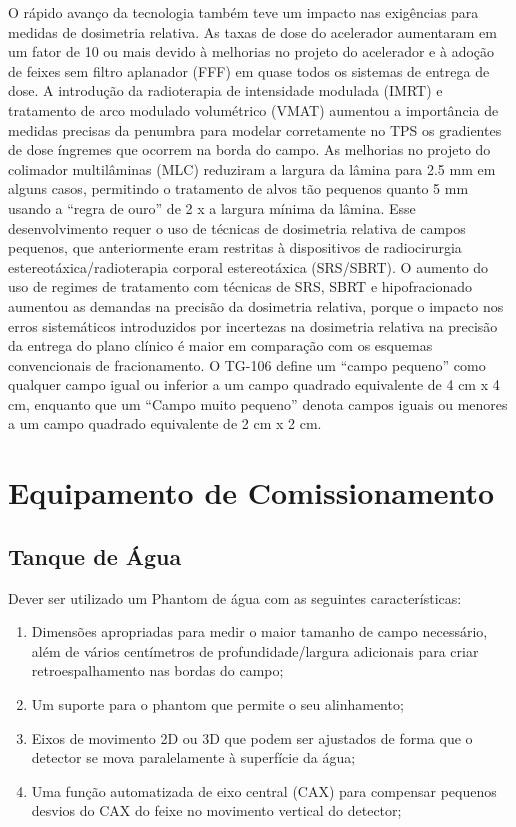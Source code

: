 \documentclass[11pt,a4paper]{article}
\begin{document}
	O rápido avanço da tecnologia também teve um impacto nas exigências para medidas de dosimetria relativa. As taxas de dose do acelerador aumentaram em um fator de 10 ou mais devido à melhorias no projeto do acelerador e à adoção de feixes sem filtro aplanador (FFF) em quase todos os sistemas de entrega de dose. A introdução da radioterapia de intensidade modulada (IMRT) e tratamento de arco modulado volumétrico (VMAT) aumentou a importância de medidas precisas da penumbra para modelar corretamente no TPS os gradientes de dose íngremes que ocorrem na borda do campo. As melhorias no projeto do colimador multilâminas (MLC) reduziram a largura da lâmina para 2.5 mm em alguns casos, permitindo o tratamento de alvos tão pequenos quanto 5 mm usando a ``regra de ouro'' de 2 x a largura mínima da lâmina. Esse desenvolvimento requer o uso de técnicas de dosimetria relativa de campos pequenos, que anteriormente eram restritas à dispositivos de radiocirurgia estereotáxica/radioterapia corporal estereotáxica (SRS/SBRT). O aumento do uso de regimes de tratamento com técnicas de SRS, SBRT e hipofracionado aumentou as demandas na precisão da dosimetria relativa, porque o impacto nos erros sistemáticos introduzidos por incertezas na dosimetria relativa na precisão da entrega do plano clínico é maior em comparação com os esquemas convencionais de fracionamento. O TG-106 define um “campo pequeno” como qualquer campo igual ou inferior a um campo quadrado equivalente de 4 cm x 4 cm, enquanto que um “Campo muito pequeno” denota campos iguais ou menores a um campo quadrado equivalente de 2 cm x 2 cm.

\section{Equipamento de Comissionamento}

\subsection{Tanque de Água}

	Dever ser utilizado um Phantom de água com as seguintes características:

	\begin{enumerate}
		\item Dimensões apropriadas para medir o maior tamanho de campo necessário, além de vários centímetros de profundidade/largura adicionais para criar retroespalhamento nas bordas do campo;
		\item Um suporte para o phantom que permite o seu alinhamento;
		\item Eixos de movimento 2D ou 3D que podem ser ajustados de forma que o detector se mova paralelamente à superfície da água;
		\item Uma função automatizada de eixo central (CAX) para compensar pequenos desvios do CAX do feixe no movimento vertical do detector;
	\end{enumerate}
\end{document}
